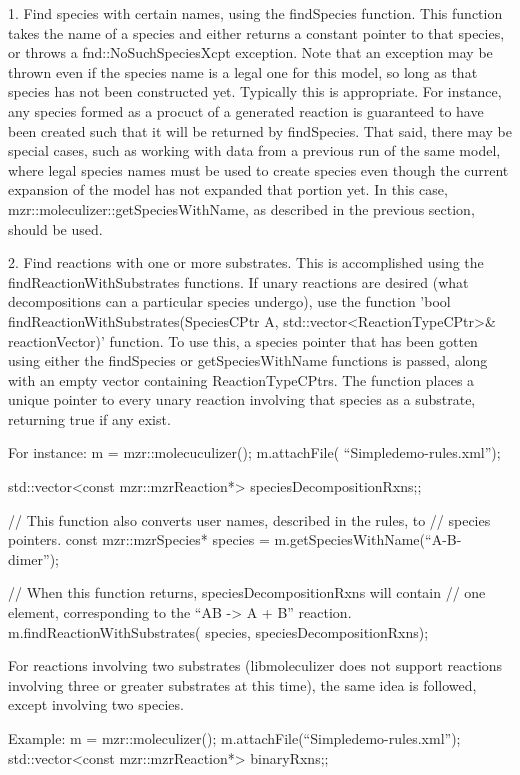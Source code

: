 \begin{1st listing}
1.
Find species with certain names, using the findSpecies function.  This
function takes the name of a species and either returns a constant
pointer to that species, or throws a fnd::NoSuchSpeciesXcpt
exception.  Note that an exception may be thrown even if the species
name is a legal one for this model, so long as that species has not
been constructed yet.  Typically this is appropriate.  For instance,
any species formed as a procuct of a generated reaction is guaranteed
to have been created such that it will be returned by findSpecies.
That said, there may be special cases, such as working with data from
a previous run of the same model, where legal species names must be
used to create species even though the current expansion of the model
has not expanded that portion yet.  In this case,
mzr::moleculizer::getSpeciesWithName, as described in the previous
section, should be used.  

2.  Find reactions with one or more substrates.
This is accomplished using the findReactionWithSubstrates functions.
If unary reactions are desired (what decompositions can a particular
species undergo), use the function 'bool
findReactionWithSubstrates(SpeciesCPtr A,
std::vector<ReactionTypeCPtr>& reactionVector)' function.  To use
this, a species pointer that has been gotten using either the
findSpecies or getSpeciesWithName functions is passed, along with an
empty vector containing ReactionTypeCPtrs.  The function places a
unique pointer to every unary reaction involving that species as a
substrate, returning true if any exist.  

For instance:
m = mzr::molecuculizer();
m.attachFile( ``Simpledemo-rules.xml''); 

std::vector<const mzr::mzrReaction*> speciesDecompositionRxns;;

// This function also converts user names, described in the rules, to
// species pointers.
const mzr::mzrSpecies* species = m.getSpeciesWithName(``A-B-dimer'');

// When this function returns, speciesDecompositionRxns will contain
// one element, corresponding to the ``AB -> A + B'' reaction.  
m.findReactionWithSubstrates( species, speciesDecompositionRxns);

For reactions involving two substrates (libmoleculizer does not
support reactions involving three or greater substrates at this time),
the same idea is followed, except involving two species.  

Example:
m = mzr::moleculizer();
m.attachFile(``Simpledemo-rules.xml'');
std::vector<const mzr::mzrReaction*> binaryRxns;;


\end{1st listing}
